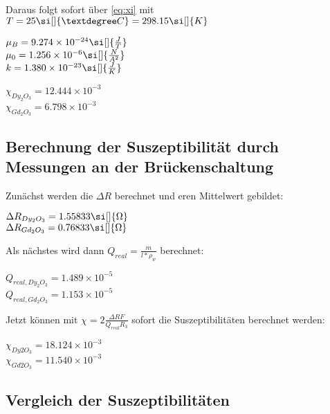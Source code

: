 Daraus folgt sofort über \autoref{eq:xi} mit $T=25\si[]{°C}=298.15\si[]{K}$
\begin{center}
    $\mu_B=9.274\times 10^{-24}\si[]{\frac{J}{T}}$\\
    $\mu_0=1.256\times 10^{-6}\si[]{\frac{N}{A^2}}$\\
    $k=1.380\times 10^{-23}\si[]{\frac{J}{K}}$

\end{center}
\begin{center}
    $\chi_{Dy_2 O_3}=12.444 \times 10^{-3}$\\
    $\chi_{Gd_2 O_3}=6.798 \times 10^{-3}$
\end{center}

\subsection{Berechnung der Suszeptibilität durch Messungen an der Brückenschaltung}
\label{sec:messung}
Zunächst werden die $\Delta R$ berechnet und eren Mittelwert gebildet:
\begin{center}
    $\Delta R_{Dy_2 O_3}=1.55833 \si[]{\Omega}$\\
    $\Delta R_{Gd_2 O_3}=0.76833 \si[]{\Omega}$
\end{center}
Als nächstes wird dann $Q_{real}=\frac{m}{l*\rho_w}$ berechnet:
\begin{center}
    $Q_{real, Dy_2 O_3}=1.489 \times 10^{-5}$\\
    $Q_{real, Gd_2 O_3}=1.153 \times 10^{-5}$
\end{center}
Jetzt können mit $\chi=2\frac{\Delta R F}{Q_{real} R_3}$ sofort die Suszeptibilitäten berechnet werden:
\begin{center}
    $\chi_{Dy2 O_3}=18.124 \times 10^{-3}$\\
    $\chi_{Gd2 O_3}=11.540 \times 10^{-3}$
\end{center}
\subsection{Vergleich der Suszeptibilitäten}
\label{sec:vergleich}